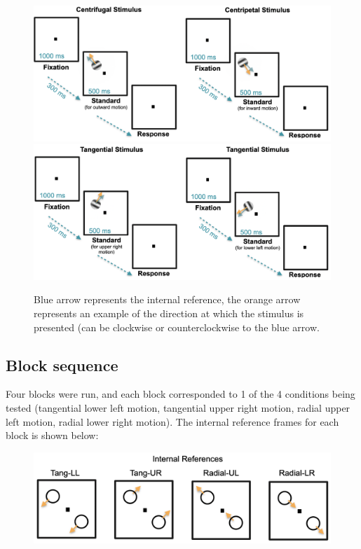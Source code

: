 \documentclass[11pt]{article} %
\begin{document}
\begin{figure}[H]
\centering %
\includegraphics[scale=.4]{Images/Radial_sequence.png}
\\
\includegraphics[scale=.4]{Images/Tang_sequence.png}
\caption{Blue arrow represents the internal reference, the orange arrow represents an example of the direction at which the stimulus is presented (can be clockwise or counterclockwise to the blue arrow.}
\end{figure}

\subsection{Block sequence}
Four blocks were run, and each block corresponded to 1 of the 4 conditions being tested (tangential lower left motion, tangential upper right motion, radial upper left motion, radial lower right motion). The internal reference frames for each block is shown below:

\begin{figure}[H]
\centering %
\includegraphics[scale=.4]{Images/Blocks.png}
\end{figure}
\end{document}
